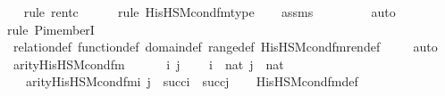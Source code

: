 \begin{isabellebody}
\ \ \isamarkupfalse%
{\isacharparenleft}{\kern0pt}rule\ ren{\isacharunderscore}{\kern0pt}tc{\isacharparenright}{\kern0pt}\isanewline
\ \ \ \ \ \isamarkupfalse%
{\isacharparenleft}{\kern0pt}rule\ His{\isacharunderscore}{\kern0pt}HS{\isacharunderscore}{\kern0pt}M{\isacharunderscore}{\kern0pt}cond{\isacharunderscore}{\kern0pt}fm{\isacharunderscore}{\kern0pt}type{\isacharparenright}{\kern0pt}\isanewline
\ \ \isamarkupfalse%
\ assms\ \isanewline
\ \ \ \ \ \ \isamarkupfalse%
\ auto{\isacharbrackleft}{\kern0pt}{}{\isacharbrackright}{\kern0pt}\ \isanewline
\ \ \isamarkupfalse%
{\isacharparenleft}{\kern0pt}rule\ Pi{\isacharunderscore}{\kern0pt}memberI{\isacharparenright}{\kern0pt}\isanewline
\ \ \isamarkupfalse%
\ relation{\isacharunderscore}{\kern0pt}def\ function{\isacharunderscore}{\kern0pt}def\ domain{\isacharunderscore}{\kern0pt}def\ range{\isacharunderscore}{\kern0pt}def\ His{\isacharunderscore}{\kern0pt}HS{\isacharunderscore}{\kern0pt}M{\isacharunderscore}{\kern0pt}cond{\isacharunderscore}{\kern0pt}fm{\isacharunderscore}{\kern0pt}ren{\isacharunderscore}{\kern0pt}def\ \isanewline
\ \ \isamarkupfalse%
\ auto%
\endisatagproof
{\isafoldproof}%
%
\isadelimproof
\isanewline
%
\endisadelimproof
\isanewline
{}\isamarkupfalse%
\ arity{\isacharunderscore}{\kern0pt}His{\isacharunderscore}{\kern0pt}HS{\isacharunderscore}{\kern0pt}M{\isacharunderscore}{\kern0pt}cond{\isacharunderscore}{\kern0pt}fm{\isacharprime}{\kern0pt}\ {\isacharcolon}{\kern0pt}\ \ \isanewline
\ \ \ i\ j\ \isanewline
\ \ \ {\isachardoublequoteopen}i\ {\isasymin}\ nat{\isachardoublequoteclose}\ {\isachardoublequoteopen}j\ {\isasymin}\ nat{\isachardoublequoteclose}\isanewline
\ \ \ {\isachardoublequoteopen}arity{\isacharparenleft}{\kern0pt}His{\isacharunderscore}{\kern0pt}HS{\isacharunderscore}{\kern0pt}M{\isacharunderscore}{\kern0pt}cond{\isacharunderscore}{\kern0pt}fm{\isacharprime}{\kern0pt}{\isacharparenleft}{\kern0pt}i{\isacharcomma}{\kern0pt}\ j{\isacharparenright}{\kern0pt}{\isacharparenright}{\kern0pt}\ {\isasymle}\ succ{\isacharparenleft}{\kern0pt}i{\isacharparenright}{\kern0pt}\ {\isasymunion}\ succ{\isacharparenleft}{\kern0pt}j{\isacharparenright}{\kern0pt}{\isachardoublequoteclose}\isanewline
%
\isadelimproof
\ \ %
\endisadelimproof
%
\isatagproof
{}\isamarkupfalse%
\ His{\isacharunderscore}{\kern0pt}HS{\isacharunderscore}{\kern0pt}M{\isacharunderscore}{\kern0pt}cond{\isacharunderscore}{\kern0pt}fm{\isacharprime}{\kern0pt}{\isacharunderscore}{\kern0pt}def\ \isanewline

\end{isabellebody}
